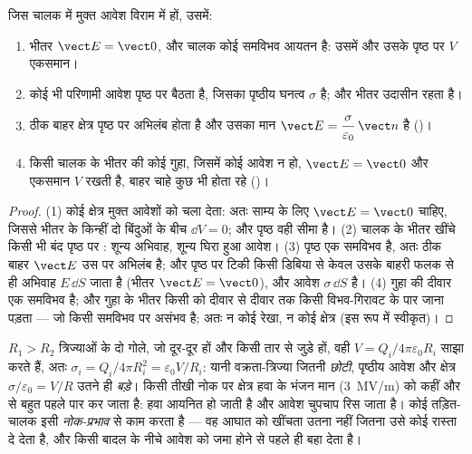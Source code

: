 \begin{theorem}[साम्य में किसी चालक के गुण]\label{thm:b1:potential-capacitors:conductor}
जिस चालक में मुक्त आवेश विराम में हों, उसमें:
\begin{enumerate}
  \item भीतर $\vect E = \vect 0$, और चालक कोई समविभव आयतन है:
        उसमें और उसके पृष्ठ पर $V$ एकसमान।
  \item कोई भी परिणामी आवेश पृष्ठ पर बैठता है, जिसका पृष्ठीय घनत्व
        $\sigma$ है; और भीतर उदासीन रहता है।
  \item ठीक बाहर क्षेत्र पृष्ठ पर अभिलंब होता है और उसका मान
        $\vect E = \dfrac{\sigma}{\varepsilon_0}\,\vect n$ है (\emph{})।
  \item किसी चालक के भीतर की कोई गुहा, जिसमें कोई आवेश न हो, $\vect E =
        \vect 0$ और एकसमान $V$ रखती है, बाहर चाहे कुछ भी होता रहे
        (\emph{})।
\end{enumerate}
\end{theorem}

\begin{proof}
(1) कोई क्षेत्र मुक्त आवेशों को चला देता: अतः साम्य के लिए $\vect E =
\vect 0$ चाहिए, जिससे भीतर के किन्हीं दो बिंदुओं के बीच $\dd V = 0$; और
पृष्ठ वही सीमा है। (2) चालक के भीतर खींचे किसी भी बंद पृष्ठ पर : शून्य अभिवाह, शून्य घिरा हुआ आवेश। (3) पृष्ठ एक समविभव है, अतः ठीक
बाहर $\vect E$ उस पर अभिलंब है; और पृष्ठ पर टिकी किसी डिबिया से केवल उसके
बाहरी फलक से ही अभिवाह $E\,\dd S$ जाता है (भीतर $\vect E = \vect 0$), और
आवेश $\sigma\,\dd S$ है। (4) गुहा की दीवार एक समविभव है; और गुहा के भीतर
किसी  को दीवार से दीवार तक किसी विभव-गिरावट के पार जाना पड़ता
--- जो किसी समविभव पर असंभव है; अतः न कोई रेखा, न कोई क्षेत्र (इस रूप में
स्वीकृत)।
\end{proof}

\begin{example}[नोक-प्रभाव और तड़ित-चालक]\label{ex:b1:potential-capacitors:point}
$R_1 > R_2$ त्रिज्याओं के दो गोले, जो दूर-दूर हों और किसी तार से जुड़े हों,
वही $V = Q_i/4\pi\varepsilon_0R_i$ साझा करते हैं, अतः $\sigma_i = Q_i/4\pi R_i^2 = \varepsilon_0V/R_i$:
यानी वक्रता-त्रिज्या जितनी \emph{छोटी}, पृष्ठीय आवेश और क्षेत्र
$\sigma/\varepsilon_0 = V/R$ उतने ही \emph{बड़े}। किसी तीखी नोक पर क्षेत्र हवा के
भंजन मान (\qty{3}{MV/m}) को कहीं और से बहुत पहले पार कर जाता है: हवा
आयनित हो जाती है और आवेश चुपचाप रिस जाता है। कोई तड़ित-चालक इसी
\emph{नोक-प्रभाव} से काम करता है --- वह आघात को खींचता उतना नहीं जितना उसे
कोई रास्ता दे देता है, और किसी बादल के नीचे आवेश को जमा होने से पहले ही बहा
देता है।
\end{example}

